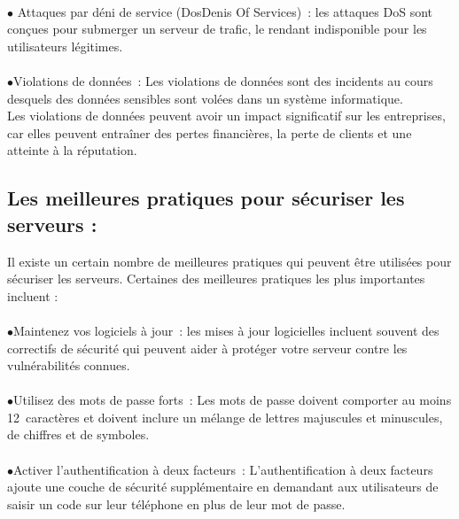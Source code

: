  \paragraph{ }$\bullet$ Attaques par déni de service (\ac{Dos}{Denis Of Services}) :  les attaques DoS sont conçues pour submerger un serveur de trafic, le rendant indisponible pour les utilisateurs légitimes.\\
 
 \paragraph{ }$\bullet$Violations de données :  Les violations de données sont des incidents au cours desquels des données sensibles sont volées dans un système informatique.
 \\ Les violations de données peuvent avoir un impact significatif sur les entreprises, car elles peuvent entraîner des pertes financières, la perte de clients et une atteinte à la réputation.

 \paragraph{}\subsection{Les meilleures pratiques pour sécuriser les serveurs :}
 

Il existe un certain nombre de meilleures pratiques qui peuvent être utilisées pour sécuriser les serveurs. Certaines des meilleures pratiques les plus importantes incluent :

\paragraph{ } $\bullet$Maintenez vos logiciels à jour :   les mises à jour logicielles incluent souvent des correctifs de sécurité qui peuvent aider à protéger votre serveur contre les vulnérabilités connues.\\
 \paragraph{ }$\bullet$Utilisez des mots de passe forts :  Les mots de passe doivent comporter au moins 12 caractères et doivent inclure un mélange de lettres majuscules et minuscules, de chiffres et de symboles.\\
\paragraph{ }$\bullet$Activer l'authentification à deux facteurs :  L'authentification à deux facteurs ajoute une couche de sécurité supplémentaire en demandant aux utilisateurs de saisir un code sur leur téléphone en plus de leur mot de passe.\\
